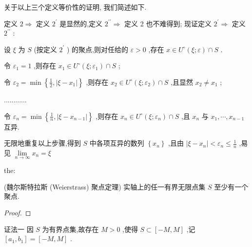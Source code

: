 关于以上三个定义等价性的证明, 我们简述如下.

定义 \(2 \Rightarrow\) 定义 \({2}^{\prime }\) 是显然的,定义 \({2}^{\prime \prime } \Rightarrow\) 定义 2 也不难得到; 现证定义 \({2}^{\prime } \Rightarrow\) 定义 \({2}^{\prime \prime }\) :

设 \(\xi\) 为 \(S\) (按定义 \({2}^{\prime }\) ) 的聚点,则对任给的 \(\varepsilon  > 0\) ,存在 \(x \in  {U}^{ \circ  }\left( {\xi ;\varepsilon }\right)  \cap  S\) .

令 \({\varepsilon }_{1} = 1\) ,则存在 \({x}_{1} \in  {U}^{ \circ  }\left( {\xi ;{\varepsilon }_{1}}\right)  \cap  S\) ;

令 \({\varepsilon }_{2} = \min \left\{  {\frac{1}{2},\left| {\xi  - {x}_{1}}\right| }\right\}\) ,则存在 \({x}_{2} \in  {U}^{ \circ  }\left( {\xi ;{\varepsilon }_{2}}\right)  \cap  S\) ,且显然 \({x}_{2} \neq  {x}_{1}\) ;

............

令 \({\varepsilon }_{n} = \min \left\{  {\frac{1}{n},\left| {\xi  - {x}_{n - 1}}\right| }\right\}\) ,则存在 \({x}_{n} \in  {U}^{ \circ  }\left( {\xi ;{\varepsilon }_{n}}\right)  \cap  S\) ,且 \({x}_{n}\) 与 \({x}_{1},\cdots ,{x}_{n - 1}\) 互异.

无限地重复以上步骤,得到 \(S\) 中各项互异的数列 \(\left\{  {x}_{n}\right\}\) ,且由 \(\left| {\xi  - {x}_{n}}\right|  < {\varepsilon }_{n} \leq  \frac{1}{n}\) ,易见 \(\mathop{\lim }\limits_{{n \rightarrow  \infty }}{x}_{n} = \xi\)

\begin{theorem}{}{the:}

\end{theorem}
 (魏尔斯特拉斯 (Weierstrass) 聚点定理) 实轴上的任一有界无限点集 \(S\) 至少有一个聚点.

\begin{proof}

\end{proof}
证法一 因 \(S\) 为有界点集,故存在 \(M > 0\) ,使得 \(S \subset  \left\lbrack  {-M,M}\right\rbrack\) ,记 \(\left\lbrack  {{a}_{1},{b}_{1}}\right\rbrack   = \left\lbrack  {-M,M}\right\rbrack\) .

